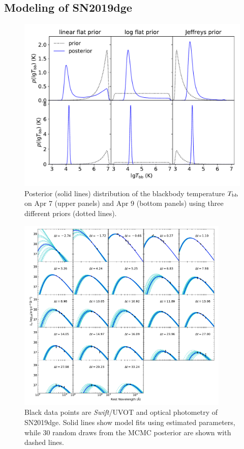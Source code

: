 \documentclass[twocolumn]{aastex63}
\newcommand{\name}{SN2019dge}
\newcommand{\swift}{\textit{Swift}}
\begin{document}
\begin{CJK*}{UTF8}{gbsn}
\section{Modeling of \name}

\begin{figure}[htbp!]
	\centering
	\includegraphics[width=\columnwidth]{figures/bbprior.pdf}
	\caption{Posterior (solid lines) distribution of the blackbody temperature 
		$T_{\rm bb}$ on Apr 7 (upper panels) and Apr 9 (bottom panels) using three different priors 
		(dotted 
		lines).	\label{fig:bbprior}}
\end{figure}

\begin{figure}
	\centering
	\includegraphics[width = 0.9\textwidth]{figures/seds_log.pdf}
	\caption{Black data points are \swift/UVOT and optical photometry of \name. Solid lines show 
		model fits using estimated parameters, while 30 random draws from the MCMC posterior are 
		shown with dashed lines.
		\label{fig:seds}}
\end{figure}



\end{CJK*}
\end{document}

